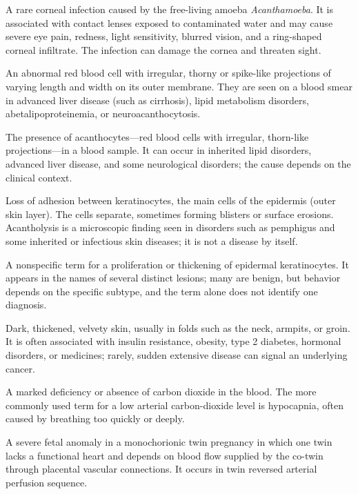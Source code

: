  A rare corneal infection caused by the free-living amoeba
\textit{Acanthamoeba}. It is associated with contact lenses exposed to contaminated water and
may cause severe eye pain, redness, light sensitivity, blurred vision, and a ring-shaped
corneal infiltrate. The infection can damage the cornea and threaten sight.

 An abnormal red blood cell with irregular, thorny or spike-like projections of varying length and width on its outer membrane. They are seen on a blood smear in advanced liver disease (such as cirrhosis), lipid metabolism disorders, abetalipoproteinemia, or neuroacanthocytosis.

 The presence of acanthocytes—red blood cells with irregular, thorn-like projections—in a blood sample. It can occur in inherited lipid disorders, advanced liver disease, and some neurological disorders; the cause depends on the clinical context.

 Loss of adhesion between keratinocytes, the main cells of the epidermis (outer skin layer). The cells separate, sometimes forming blisters or surface erosions. Acantholysis is a microscopic finding seen in disorders such as pemphigus and some inherited or infectious skin diseases; it is not a disease by itself.

 A nonspecific term for a proliferation or thickening of epidermal keratinocytes. It appears in the names of several distinct lesions; many are benign, but behavior depends on the specific subtype, and the term alone does not identify one diagnosis.

 Dark, thickened, velvety skin, usually in folds
such as the neck, armpits, or groin. It is often associated with insulin
resistance, obesity, type 2 diabetes, hormonal disorders, or medicines; rarely,
sudden extensive disease can signal an underlying cancer.

 A marked deficiency or absence of carbon dioxide in the blood. The more commonly used term for a low arterial carbon-dioxide level is hypocapnia, often caused by breathing too quickly or deeply.

 A severe fetal anomaly in a monochorionic twin pregnancy in which one twin lacks a functional heart and depends on blood flow supplied by the co-twin through placental vascular connections. It occurs in twin reversed arterial perfusion sequence.

